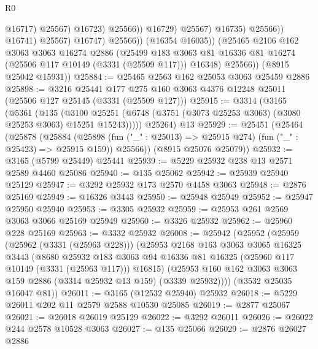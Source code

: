 \begin{lexlean}{R0}
\begin{coremodule}
                                        @16717)
                                      @25567)
                                    @16723)
                                  @25566))
                              @16729)
                            @25567)
                          @16735)
                        @25566))
                    @16741)
                  @25567)
                @16747)
              @25566))
          (@16354 @16035))
        (@25465
          @2106
          @162
          @3063
          @3063
          @16274
          @2886
          (@25499
            @183
            @3063
            @81
            @16336
            @81
            @16274
            (@25506 @117 @10149 (@3331 (@25509 @117)))
            @16348)
          @25566))
      (@8915 @25042 @15931))
@25884 := @25465 @2563 @162 @25053 @3063 @25459 @2886
@25898 := @3216
    @25441
    @177
    @275
    @160
    @3063
    @4376
    @12248
    @25011
    (@25506 @127 @25145 (@3331 (@25509 @127)))
@25915 := @3314
    (@3165
      (@5361
        (@135
          (@3100 @25251 (@6748 (@3751 (@3073 @25253 @3063) (@3080 @25253 @3063) @15251 @15243)))))
      @25264)
    @13
@25929 := @25451
    (@25464
      (@25878
        (@25884
          (@25898 (fun ("_" : @25013) => @25915 @274) (fun ("_" : @25423) => @25915 @159))
          @25566))
      (@8915 @25076 @25079))
@25932 := @3165 (@5799 @25449) @25441
@25939 := @5229 @25932 @238 @13 @2571 @2589 @4460 @25086
@25940 := @135 @25062
@25942 := @25939 @25940 @25129
@25947 := @3292 @25932 @173 @2570 @4458 @3063
@25948 := @2876 @25169
@25949 := @16326 @3443
@25950 := @25948 @25949
@25952 := @25947 @25950 @25940
@25953 := @3305 @25932
@25959 := @25953 @261 @2569 @3063 @3066 @25169 @25949
@25960 := @3326 @25932
@25962 := @25960 @228 @25169
@25963 := @3332 @25932
@26008 := @25942
    (@25952
      (@25959
        (@25962 (@3331 (@25963 @228)))
        (@25953
          @2168
          @163
          @3063
          @3065
          @16325
          @3443
          (@8680
            @25932
            @183
            @3063
            @94
            @16336
            @81
            @16325
            (@25960 @117 @10149 (@3331 (@25963 @117)))
            @16815)
          (@25953 @160 @162 @3063 @3063 @159 @2886 (@3314 @25932 @13 @159) (@3339 @25932))))
      (@3532 @25035 @16047 @81))
@26011 := @3165 (@12532 @25940) @25932
@26018 := @5229 @26011 @202 @11 @2579 @2588 @10530 @25085
@26019 := @2877 @25067
@26021 := @26018 @26019 @25129
@26022 := @3292 @26011
@26026 := @26022 @244 @2578 @10528 @3063
@26027 := @135 @25066
@26029 := @2876 @26027 @2886

\end{coremodule}
\end{lexlean}
